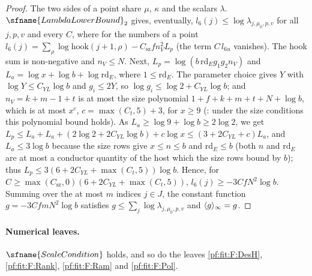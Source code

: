 \begin{proof}
The two sides of a point share $\mu$, $\kappa$ and the scalars $\lambda$. $\sfname{LambdaLowerBound}_2$ gives, eventually,
$l_6(j)\le\log\lambda_{j,\mu_0,p,v}$ for all $j,p,v$ and every $C$, where for the numbers of a point
$l_6(j)=\sum_\rho\log\mathrm{hook}(j+1,\rho)-C_{\mathrm{sz}}fn_V^2L_p$ (the term $C\,l_{6u}$ vanishes). The hook sum is
non-negative and $n_V\le N$. Next, $L_p=\log(b\,\mathrm{rd}_Eg_1g_2n_V)$ and $L_a=\log x+\log b+\log\mathrm{rd}_E$,
where $1\le\mathrm{rd}_E$. The parameter choice gives $Y$ with $\log Y\le C_{YL}\log b$ and $g_i\le2Y$, so
$\log g_i\le\log2+C_{YL}\log b$; and $n_V=k+m-1+t$ is at most the size polynomial $1+f+k+m+t+N+\log b$, which is at most
$x^{c}$, $c=\max(C_t,5)+3$, for $x\ge9$ (: under the size
conditions this polynomial bound holds). As $L_a\ge\log9+\log b\ge2\log2$, we get
$L_p\le L_a+L_a+(2\log2+2C_{YL}\log b)+c\log x\le(3+2C_{YL}+c)L_a$, and
$L_a\le3\log b$ because the size rows give $x\le n\le b$ and $\mathrm{rd}_E\le b$ (both $n$ and $\mathrm{rd}_E$ are at most
a conductor quantity of the host which the size rows bound by $b$); thus
$L_p\le3(6+2C_{YL}+\max(C_t,5))\log b$. Hence, for
$C\ge\max(C_{\mathrm{sz}},0)(6+2C_{YL}+\max(C_t,5))$, $l_6(j)\ge-3CfN^2\log b$. Summing over the at most $m$ indices
$j\in J$, the constant function $g=-3CfmN^2\log b$ satisfies $g\le\sum_j\log\lambda_{j,\mu_0,p,v}$ and $\langle g\rangle_{\infty}=g$.
\end{proof}

\paragraph{Numerical leaves.}
\begin{lemma}\label{pf:fit:leafnum}
$\sfname{ScaleCondition}$ holds, and so do the leaves \ref{pf:fit:F:DesH}, \ref{pf:fit:F:Rank}, \ref{pf:fit:F:Ram} and
\ref{pf:fit:F:Pol}.
\end{lemma}


